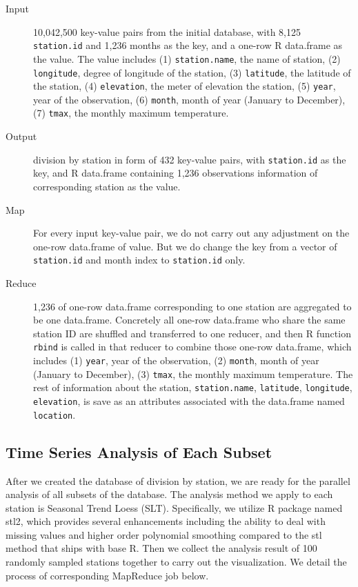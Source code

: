 \begin{description}
  \item[Input] 10,042,500 key-value pairs from the initial database, with 8,125 
  \texttt{station.id} and 1,236 months as the key, and a one-row R data.frame 
  as the value. The value includes (1) \texttt{station.name}, the name of station, 
  (2) \texttt{longitude}, degree of longitude of the station, (3) \texttt{latitude}, 
  the latitude of the station, (4) \texttt{elevation}, the meter of elevation the 
  station, (5) \texttt{year}, year of the observation, (6) \texttt{month}, month 
  of year (January to December), (7) \texttt{tmax}, the monthly maximum temperature.
  \item[Output] division by station in form of 432 key-value pairs, with 
  \texttt{station.id} as the key, and R data.frame containing 1,236 observations
  information of corresponding station as the value.
  \item[Map]For every input key-value pair, we do not carry out any adjustment on
  the one-row data.frame of value. But we do change the key from a vector of 
  \texttt{station.id} and month index to \texttt{station.id} only. 
  \item[Reduce] 1,236 of one-row data.frame corresponding to one station are 
  aggregated to be one data.frame. Concretely all one-row data.frame who share
  the same station ID are shuffled and transferred to one reducer, and then R function 
  \texttt{rbind} is called in that reducer to combine those one-row data.frame, 
  which includes (1) \texttt{year}, year of the observation, (2) \texttt{month}, 
  month of year (January to December), (3) \texttt{tmax}, the monthly maximum 
  temperature. The rest of information about the station, \texttt{station.name}, 
  \texttt{latitude}, \texttt{longitude}, \texttt{elevation}, is save as an attributes associated with the data.frame named \texttt{location}.
\end{description}

\subsection{Time Series Analysis of Each Subset}

After we created the database of division by station, we are ready for the parallel 
analysis of all subsets of the database. The analysis method we apply to each station
is Seasonal Trend Loess (SLT). Specifically, we utilize R package named stl2\cite{stl2},
which provides several enhancements including the ability to deal with missing values 
and higher order polynomial smoothing compared to the stl method that ships with 
base R. Then we collect the analysis result of 100 randomly sampled stations together 
to carry out the visualization. We detail the process of corresponding MapReduce 
job below.

